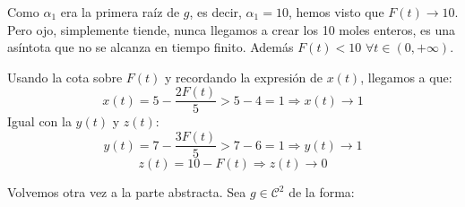 Como $\alpha_1$ era la primera raíz de $g$, es decir, $\alpha_1=10$, hemos visto que $F(t)\longrightarrow 10$. Pero ojo, simplemente tiende, nunca llegamos a crear los 10 moles enteros, es una asíntota que no se alcanza en tiempo finito. Además $F(t)<10$ $\forall t \in(0,+\infty)$.

Usando la cota sobre $F(t)$ y recordando la expresión de $x(t)$, llegamos a que:
\[
x(t)=5-\frac{2F(t)}{5}>5-4=1 \Rightarrow x(t)\longrightarrow 1
\]
Igual con la $y(t)$ y $z(t)$:
\[
y(t)=7-\frac{3F(t)}{5}>7-6=1 \Rightarrow y(t)\longrightarrow 1
\]
\[
z(t)=10-F(t) \Rightarrow z(t)\longrightarrow 0
\]

Volvemos otra vez a la parte abstracta. Sea $g\in\mathcal{C}^2$ de la forma:

\begin{center}
\end{center}

